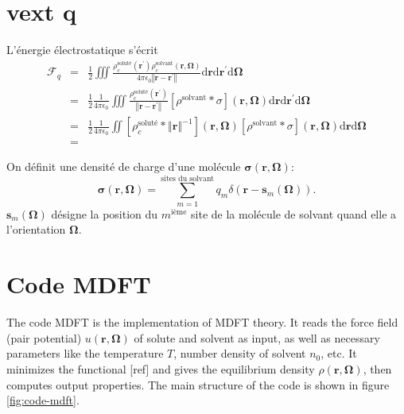 \section{vext q}

L'énergie électrostatique s'écrit
\begin{eqnarray}
\mathcal{F}_{q} & = & \frac{1}{2}\iiint\frac{\rho_{c}^{\textrm{soluté}}\left(\boldsymbol{r^{\prime}}\right)\rho_{c}^{\textrm{solvant}}\left(\boldsymbol{r},\boldsymbol{\Omega}\right)}{4\pi\epsilon_{0}\left\Vert \boldsymbol{r}-\boldsymbol{r^{\prime}}\right\Vert }\textrm{d}\boldsymbol{r}\textrm{d}\boldsymbol{r^{\prime}}\textrm{d}\boldsymbol{\Omega}\\
 & = & \frac{1}{2}\frac{1}{4\pi\epsilon_{0}}\iiint\frac{\rho_{c}^{\textrm{soluté}}\left(\boldsymbol{r^{\prime}}\right)}{\left\Vert \boldsymbol{r}-\boldsymbol{r^{\prime}}\right\Vert }\left[\rho^{\textrm{solvant}}*\sigma\right]\left(\boldsymbol{r},\boldsymbol{\Omega}\right)\textrm{d}\boldsymbol{r}\textrm{d}\boldsymbol{r^{\prime}}\textrm{d}\boldsymbol{\Omega}\\
 & = & \frac{1}{2}\frac{1}{4\pi\epsilon_{0}}\iint\left[\rho_{c}^{\textrm{soluté}}*\left\Vert \boldsymbol{r}\right\Vert ^{-1}\right]\left(\boldsymbol{r},\boldsymbol{\Omega}\right)\left[\rho^{\textrm{solvant}}*\sigma\right]\left(\boldsymbol{r},\boldsymbol{\Omega}\right)\textrm{d}\boldsymbol{r}\textrm{d}\boldsymbol{\Omega}\\
 & =
\end{eqnarray}


On définit une densité de charge d'une molécule $\boldsymbol{\sigma}\left(\boldsymbol{r},\boldsymbol{\Omega}\right)$:
\begin{equation}
\boldsymbol{\sigma}\left(\boldsymbol{r},\boldsymbol{\Omega}\right)=\sum_{m=1}^{\textrm{sites du solvant}}q_{m}\delta\left(\boldsymbol{r}-\boldsymbol{s}_{m}\left(\boldsymbol{\Omega}\right)\right).
\end{equation}
$\boldsymbol{s}_{m}\left(\boldsymbol{\Omega}\right)$ désigne la position
du $m^{\textrm{ième}}$ site de la molécule de solvant quand elle
a l'orientation $\boldsymbol{\Omega}$.


\section{Code MDFT}

The code MDFT is the implementation of \acs{MDFT} theory. It reads
the force field (pair potential) $u(\mathbf{r},\mathbf{\Omega})$
of solute and solvent as input, as well as necessary parameters like
the temperature $T$, number density of solvent $n_{0}$, etc. It
minimizes the functional {[}ref{]} and gives the equilibrium density
$\rho(\mathbf{r},\mathbf{\Omega})$, then computes output properties.
The main structure of the code is shown in figure \ref{fig:code-mdft}.

